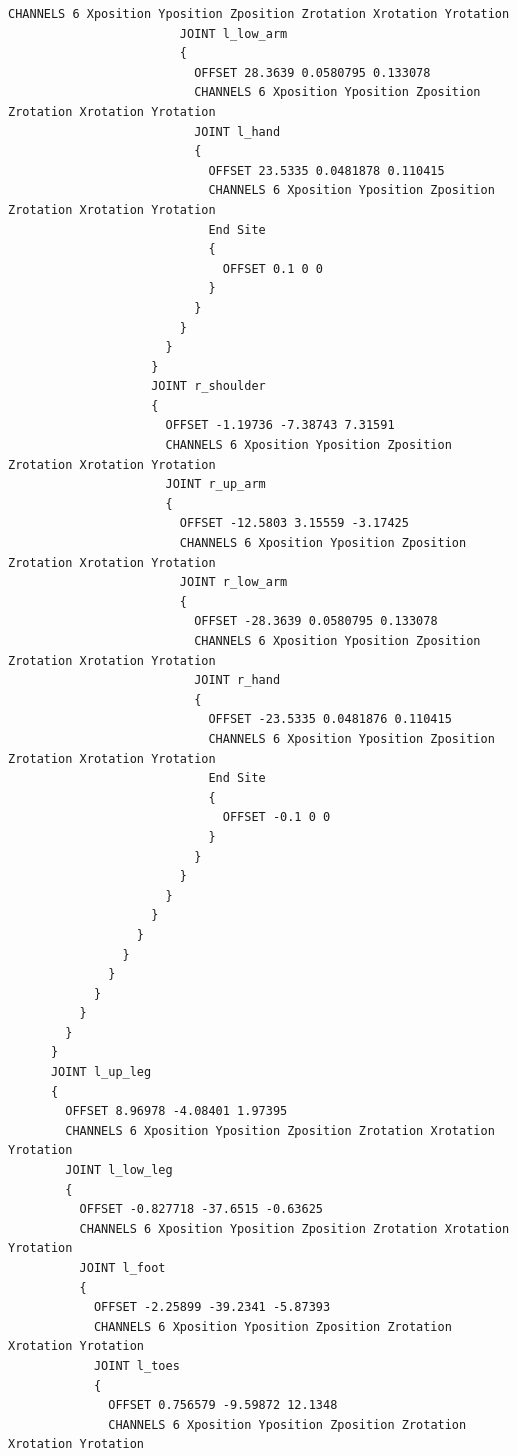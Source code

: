 \documentclass[a4j, fleqn, 12pt]{jsreport}
\begin{document}
\begin{lstlisting}[caption=mocopiのBVHファイル,label=BVH]
                        CHANNELS 6 Xposition Yposition Zposition Zrotation Xrotation Yrotation
                        JOINT l_low_arm
                        {
                          OFFSET 28.3639 0.0580795 0.133078
                          CHANNELS 6 Xposition Yposition Zposition Zrotation Xrotation Yrotation
                          JOINT l_hand
                          {
                            OFFSET 23.5335 0.0481878 0.110415
                            CHANNELS 6 Xposition Yposition Zposition Zrotation Xrotation Yrotation
                            End Site
                            {
                              OFFSET 0.1 0 0
                            }
                          }
                        }
                      }
                    }
                    JOINT r_shoulder
                    {
                      OFFSET -1.19736 -7.38743 7.31591
                      CHANNELS 6 Xposition Yposition Zposition Zrotation Xrotation Yrotation
                      JOINT r_up_arm
                      {
                        OFFSET -12.5803 3.15559 -3.17425
                        CHANNELS 6 Xposition Yposition Zposition Zrotation Xrotation Yrotation
                        JOINT r_low_arm
                        {
                          OFFSET -28.3639 0.0580795 0.133078
                          CHANNELS 6 Xposition Yposition Zposition Zrotation Xrotation Yrotation
                          JOINT r_hand
                          {
                            OFFSET -23.5335 0.0481876 0.110415
                            CHANNELS 6 Xposition Yposition Zposition Zrotation Xrotation Yrotation
                            End Site
                            {
                              OFFSET -0.1 0 0
                            }
                          }
                        }
                      }
                    }
                  }
                }
              }
            }
          }
        }
      }
      JOINT l_up_leg
      {
        OFFSET 8.96978 -4.08401 1.97395
        CHANNELS 6 Xposition Yposition Zposition Zrotation Xrotation Yrotation
        JOINT l_low_leg
        {
          OFFSET -0.827718 -37.6515 -0.63625
          CHANNELS 6 Xposition Yposition Zposition Zrotation Xrotation Yrotation
          JOINT l_foot
          {
            OFFSET -2.25899 -39.2341 -5.87393
            CHANNELS 6 Xposition Yposition Zposition Zrotation Xrotation Yrotation
            JOINT l_toes 
            {
              OFFSET 0.756579 -9.59872 12.1348
              CHANNELS 6 Xposition Yposition Zposition Zrotation Xrotation Yrotation

\end{lstlisting}
\end{document}
